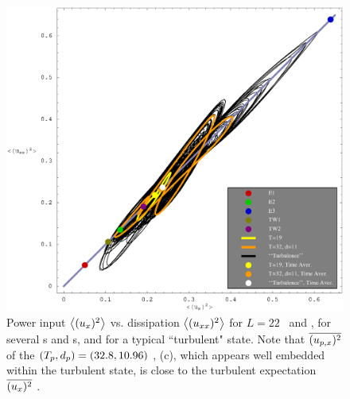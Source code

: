 \begin{figure}[t] 
\begin{center}
    \includegraphics[width=\textwidth]{figs/energyBalancePlot.eps}
\end{center}
\caption{
Power input $\left\langle {(u_{x})^2} \right\rangle$ vs.
dissipation $\left\langle {(u_{xx})^2} \right\rangle$ for $L=22$ \eqva\
and \reqva, for several
\po s and \rpo s, and for a typical ``turbulent"
state. Note that $\overline{(u_{p,x})^2}$
of the
$({T_{p}},d_p) =(32.8,10.96)$
 {\rpo}, (c), which appears well embedded
within the turbulent state, is close to the turbulent
expectation $\overline{(u_x)^2}$
.
        }
\label{f:drivedrag}
\end{figure}

